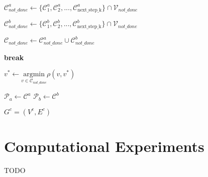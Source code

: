 \documentclass{article}
\begin{document}
\begin{algorithm}
\begin{algorithmic}[1]
        \State $\mathcal{C}^a_{not\_done} \gets \{\mathcal{C}^a_1, \mathcal{C}^a_2, ..., \mathcal{C}^a_{ \text{next\_step\_k} } \} \cap \mathcal{V}_{not\_done}$

        \State $\mathcal{C}^b_{not\_done} \gets \{\mathcal{C}^b_1, \mathcal{C}^b_2, ..., \mathcal{C}^b_{ \text{next\_step\_k} } \}  \cap \mathcal{V}_{not\_done}$
        
        
        \State $\mathcal{C}_{not\_done} \gets \mathcal{C}^a_{not\_done} \cup \mathcal{C}^b_{not\_done}$
        
            \State \textbf{break}
        \EndIf
        
        \State $v^* \gets \underset{v \in \mathcal{C}_{not\_done}}{\mathrm{argmin}} \rho(v, v^*)$
        
        \State $\mathcal{P}_a \gets \mathcal{C}^a$
        \State $\mathcal{P}_b \gets \mathcal{C}^b$
    \EndWhile
\EndWhile

\State \Return $G^c=(V^c,E^c)$


\end{algorithmic}
\end{algorithm}

\section{Computational Experiments}
TODO






\end{document}
